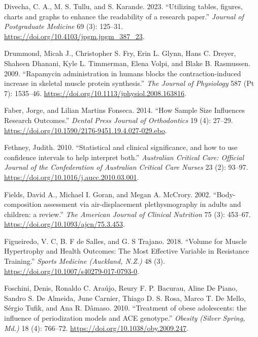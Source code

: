 \documentclass[
  letterpaper,
  DIV=11,
  numbers=noendperiod]{scrreprt}
\newlength{\cslhangindent}
\newlength{\cslentryspacingunit} %
\newenvironment{CSLReferences}[2] %
 {%
  \setlength{\parindent}{0pt}
  \ifodd #1
  \let\oldpar\par
  \def\par{\hangindent=\cslhangindent\oldpar}
  \fi
  \setlength{\parskip}{#2\cslentryspacingunit}
 }%
 {}
\begin{document}
\begin{CSLReferences}{1}{0}
\leavevmode{}%
Divecha, C. A., M. S. Tullu, and S. Karande. 2023. {``Utilizing tables,
figures, charts and graphs to enhance the readability of a research
paper.''} \emph{Journal of Postgraduate Medicine} 69 (3): 125--31.
\url{https://doi.org/10.4103/jpgm.jpgm_387_23}.

\leavevmode{}%
Drummond, Micah J., Christopher S. Fry, Erin L. Glynn, Hans C. Dreyer,
Shaheen Dhanani, Kyle L. Timmerman, Elena Volpi, and Blake B. Rasmussen.
2009. {``Rapamycin administration in humans blocks the
contraction-induced increase in skeletal muscle protein synthesis.''}
\emph{The Journal of Physiology} 587 (Pt 7): 1535--46.
\url{https://doi.org/10.1113/jphysiol.2008.163816}.

\leavevmode{}%
Faber, Jorge, and Lilian Martins Fonseca. 2014. {``How Sample Size
Influences Research Outcomes.''} \emph{Dental Press Journal of
Orthodontics} 19 (4): 27--29.
\url{https://doi.org/10.1590/2176-9451.19.4.027-029.ebo}.

\leavevmode{}%
Fethney, Judith. 2010. {``Statistical and clinical significance, and how
to use confidence intervals to help interpret both.''} \emph{Australian
Critical Care: Official Journal of the Confederation of Australian
Critical Care Nurses} 23 (2): 93--97.
\url{https://doi.org/10.1016/j.aucc.2010.03.001}.

\leavevmode{}%
Fields, David A., Michael I. Goran, and Megan A. McCrory. 2002.
{``Body-composition assessment via air-displacement plethysmography in
adults and children: a review.''} \emph{The American Journal of Clinical
Nutrition} 75 (3): 453--67. \url{https://doi.org/10.1093/ajcn/75.3.453}.

\leavevmode{}%
Figueiredo, V. C, B. F de Salles, and G. S Trajano. 2018. {``Volume for
Muscle Hypertrophy and Health Outcomes: The Most Effective Variable in
Resistance Training.''} \emph{Sports Medicine (Auckland, N.Z.)} 48 (3).
\url{https://doi.org/10.1007/s40279-017-0793-0}.

\leavevmode{}%
Foschini, Denis, Ronaldo C. Araújo, Reury F. P. Bacurau, Aline De Piano,
Sandro S. De Almeida, June Carnier, Thiago D. S. Rosa, Marco T. De
Mello, Sérgio Tufik, and Ana R. Dâmaso. 2010. {``Treatment of obese
adolescents: the influence of periodization models and ACE genotype.''}
\emph{Obesity (Silver Spring, Md.)} 18 (4): 766--72.
\url{https://doi.org/10.1038/oby.2009.247}.


\end{CSLReferences}
\end{document}
